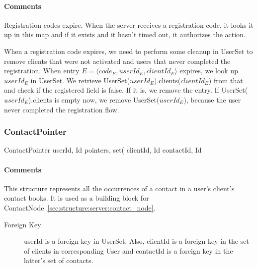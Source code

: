 \documentclass[a4paper,10pt]{article}
\begin{document}
\begin{inparaitem}[ ]
 \item \unique
 \item \persistent
 \item \secure
\end{inparaitem}

\paragraph*{Comments}
Registration codes expire. When the server receives a registration code, it looks it up in this map and if it exists and it hasn't timed out, it authorizes the action.

When a registration code expires, we need to perform some cleanup in UserSet to remove clients that were not activated and users that never completed the registration. When entry 
$E=\langle code_E,userId_E,clientId_E\rangle$ expires, we look up $userId_E$ in UserSet. We retrieve UserSet($userId_E$).clients($clientId_E$) from that and check if the 
registered field is false. If it is, we remove the entry. If UserSet($userId_E$).clients is empty now, we remove UserSet($userId_E$), because the user never completed the 
registration flow.

\subsubsection{ContactPointer}

\begin{verbbox}
ContactPointer
{
  userId, Id
  pointers, set({
    clientId, Id
    contactId, Id
    }
}
\end{verbbox}
\begin{center}
\theverbbox
\end{center}

\begin{inparaitem}[ ]
 \item \infrastructure
\end{inparaitem}

\paragraph*{Comments}
This structure represents all the occurrences of a contact in a user's client's contact books. It is used as a building block for 
ContactNode~\ref{sec:structure:server:contact_node}.

\SpecialItem
\begin{description}
 \item[Foreign Key] userId is a foreign key in UserSet. Also, clientId is a foreign key in the set of clients in corresponding User and contactId is a foreign key in the latter's 
set of contacts.
\end{description}
\end{document}
